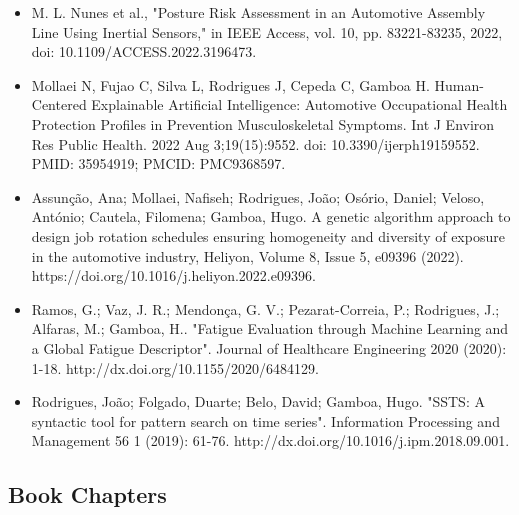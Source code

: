 \begin{itemize}
\item M. L. Nunes et al., "Posture Risk Assessment in an Automotive Assembly Line Using Inertial Sensors," in IEEE Access, vol. 10, pp. 83221-83235, 2022, doi: 10.1109/ACCESS.2022.3196473.

\item Mollaei N, Fujao C, Silva L, Rodrigues J, Cepeda C, Gamboa H. Human-Centered Explainable Artificial Intelligence: Automotive Occupational Health Protection Profiles in Prevention Musculoskeletal Symptoms. Int J Environ Res Public Health. 2022 Aug 3;19(15):9552. doi: 10.3390/ijerph19159552. PMID: 35954919; PMCID: PMC9368597.

\item Assunção, Ana; Mollaei, Nafiseh; Rodrigues, João; Osório, Daniel; Veloso, António; Cautela, Filomena; Gamboa, Hugo. A genetic algorithm approach to design job rotation schedules ensuring homogeneity and diversity of exposure in the automotive industry, Heliyon, Volume 8, Issue 5, e09396 (2022). https://doi.org/10.1016/j.heliyon.2022.e09396.

\item Ramos, G.; Vaz, J. R.; Mendonça, G. V.; Pezarat-Correia, P.; Rodrigues, J.; Alfaras, M.; Gamboa, H.. "Fatigue Evaluation through Machine Learning and a Global Fatigue Descriptor". Journal of Healthcare Engineering 2020 (2020): 1-18. http://dx.doi.org/10.1155/2020/6484129.

\item Rodrigues, João; Folgado, Duarte; Belo, David; Gamboa, Hugo. "SSTS: A syntactic tool for pattern search on time series". Information Processing and Management 56 1 (2019): 61-76. http://dx.doi.org/10.1016/j.ipm.2018.09.001.
\end{itemize}

\subsection{Book Chapters}


